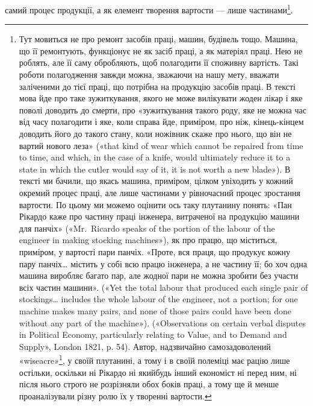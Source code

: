 \parcont{}  %
самий процес продукції, а як елемент творення вартости — лише
частинами\footnote{
Тут мовиться не про ремонт засобів праці, машин, будівель тощо.
Машина, що її ремонтують, функціонує не як засіб праці, а як матеріял
праці. Нею не роблять, але її саму обробляють, щоб полагодити її споживну
вартість. Такі роботи полагодження завжди можна, зважаючи
на нашу мету, вважати заліченими до тієї праці, що потрібна на продукцію
засобів праці. В тексті мова йде про таке зужиткування, якого не може
вилікувати жоден лікар і яке поволі доводить до смерти, про «зужиткування
такого роду, яке не можна час від часу полагодити і яке, коли справа
йде, приміром, про ніж, кінець-кінцем доводить його до такого стану,
коли ножівник скаже про нього, що він не вартий нового леза» («that
kind of wear which cannot be repaired from time to time, and which, in the
case of a knife, would ultimately reduce it to a state in which the cutler
would say of it, it is not worth a new blade»). В тексті ми бачили, що якась
машина, приміром, цілком увіходить у кожний окремий процес праці,
але лише частинами у рівночасний процес зростання вартости. По цьому
ми можемо оцінити ось таку плутанину понять: «Пан Рікардо каже про
частину праці інженера, витраченої на продукцію машини для панчіх»
(«Mr.~Ricardo speaks of the portion of the labour of the engineer in making
stocking machines»), як про працю, що міститься, приміром, у вартості
пари панчіх. «Проте, вся праця, що продукує кожну пару панчіх\dots{} містить
у собі всю працю інженера, а не частину її; бо хоч одна машина виробляє
багато пар, але жодної пари не можна зробити без участи всіх частин
машини». («Yet the total labour that produced each single pair of stockings\dots{}
includes the whole labour of the engineer, not a portion; for one
machine makes many pairs, and none of those pairs could have been done
without any part of the machine»). («Observations on certain verbal disputes
in Political Economy, particularly relating to Value, and to Demand and
Supply», London 1821, p. 54). Автор, надзвичайно самозадоволений
«wiseacre»\footnote*{
удаваний мудрак, самозадоволений дурень. 
}, у своїй плутанині, а тому і в своїй полеміці має рацію лише
остільки, оскільки ні Рікардо ні якийбудь інший економіст ні перед
ним, ні після нього строго не розрізняли обох боків праці, а тому ще
й менше проаналізували різну ролю їх у творенні вартости.
}.

